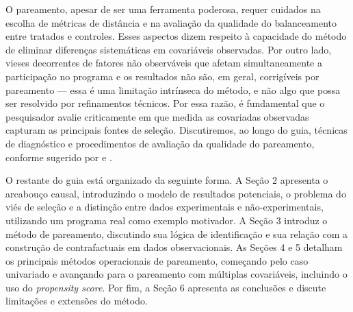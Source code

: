 O pareamento, apesar de ser uma ferramenta poderosa, requer cuidados na escolha de métricas de distância e na avaliação da qualidade do balanceamento entre tratados e controles. Esses aspectos dizem respeito à capacidade do método de eliminar diferenças sistemáticas em covariáveis observadas. Por outro lado, vieses decorrentes de fatores não observáveis que afetam simultaneamente a participação no programa e os resultados não são, em geral, corrigíveis por pareamento --- essa é uma limitação intrínseca do método, e não algo que possa ser resolvido por refinamentos técnicos. Por essa razão, é fundamental que o pesquisador avalie criticamente em que medida as covariadas observadas capturam as principais fontes de seleção. Discutiremos, ao longo do guia, técnicas de diagnóstico e procedimentos de avaliação da qualidade do pareamento, conforme sugerido por \cite{abadie2006large} e \cite{imbens2004nonparametric}.

O restante do guia está organizado da seguinte forma. A Seção 2 apresenta o arcabouço causal, introduzindo o modelo de resultados potenciais, o problema do viés de seleção e a distinção entre dados experimentais e não-experimentais, utilizando um programa real como exemplo motivador. A Seção 3 introduz o método de pareamento, discutindo sua lógica de identificação e sua relação com a construção de contrafactuais em dados observacionais. As Seções 4 e 5 detalham os principais métodos operacionais de pareamento, começando pelo caso univariado e avançando para o pareamento com múltiplas covariáveis, incluindo o uso do \textit{propensity score}. Por fim, a Seção 6 apresenta as conclusões e discute limitações e extensões do método.
